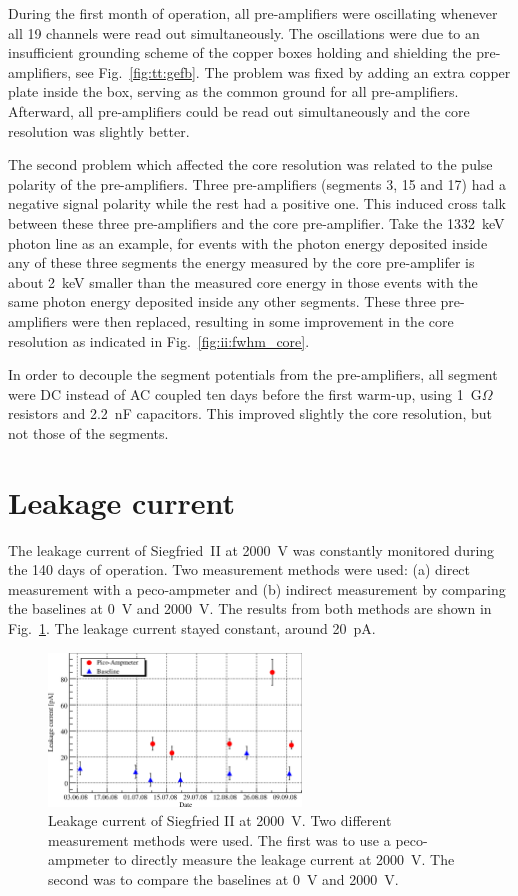 During the first month of operation, all pre-amplifiers were oscillating whenever all 19 channels were read out simultaneously. The oscillations were due to an insufficient grounding scheme of the copper boxes holding and shielding the pre-amplifiers, see Fig.~\ref{fig:tt:gefb}. The problem was fixed by adding an extra copper plate inside the box, serving as the common ground for all pre-amplifiers. Afterward, all pre-amplifiers could be read out simultaneously and the core resolution was slightly better.

The second problem which affected the core resolution was related to the pulse polarity of the pre-amplifiers. Three pre-amplifiers (segments 3, 15 and 17) had a negative signal polarity while the rest had a positive one. This induced cross talk between these three pre-amplifiers and the core pre-amplifier. Take the 1332~keV photon line as an example, for events with the photon energy deposited inside any of these three segments the energy measured by the core pre-amplifer is about 2~keV smaller than the measured core energy in those events with the same photon energy deposited inside any other segments. These three pre-amplifiers were then replaced, resulting in some improvement in the core resolution as indicated in Fig.~\ref{fig:ii:fwhm_core}.

In order to decouple the segment potentials from the pre-amplifiers, all segment were DC instead of AC coupled ten days before the first warm-up, using 1~G$\Omega$ resistors and 2.2~nF capacitors. This improved slightly the core resolution, but not those of the segments.


\section{Leakage current}
\label{sec:ii:current}
The leakage current of Siegfried~II at 2000~V was constantly monitored during the 140 days of operation. Two measurement methods were used: (a) direct measurement with a peco-ampmeter and (b) indirect measurement by comparing the baselines at 0~V and 2000~V. The results from both methods are shown in Fig.~\ref{fig:ii:lc}. The leakage current stayed constant, around 20~pA.

\begin{figure}[htbp]
\centering
\includegraphics[width=0.6\textwidth, clip]{LC}
\caption{Leakage current of Siegfried II at 2000~V. Two different measurement methods were used. The first was to use a peco-ampmeter to directly measure the leakage current at 2000~V. The second was to compare the baselines at 0~V and 2000~V.}
\label{fig:ii:lc}
\end{figure}

